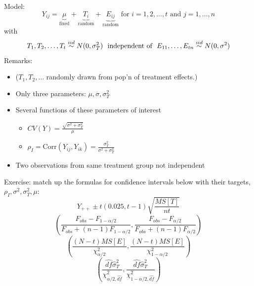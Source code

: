 Model:
$$ Y_{ij} = \underbrace{\mu}_{\text{fixed}} + \underbrace{T_i}_{\text{random}} 
+ \underbrace{E_{ij}}_{\text{random}} \text{ for }i=1,2,\ldots,t\mbox{ and }
j=1,\ldots,n$$
with
$$T_1,T_2,\ldots,T_t \stackrel{iid}{\sim} N(0,\sigma_T^2)\ \mbox{ independent of }\ E_{11},\ldots,E_{tn} \stackrel{iid}{\sim} N(0,\sigma^2)$$
\bigkn
Remarks:
\begin{itemize}
\item
($T_1,T_2,\ldots$ randomly drawn from pop'n of treatment
effects.)
\item Only three parameters: $\mu,\sigma,\sigma_T^2$
\item Several functions of these parameters of interest
\begin{itemize}
\item $CV(Y)=\frac{\sqrt{\sigma^2 + \sigma_T^2}}{\mu}$
\item $\rho_I=\mbox{Corr}(Y_{ij},Y_{ik})=\frac{\sigma_T^2}{\sigma^2 + \sigma_T^2}$
\end{itemize}
\item Two observations from same treatment group not independent
\end{itemize}
Exercise: match up the formulas for confidence intervals
below with their targets, $\rho_I,\sigma^2,\sigma_T^2,\mu$: 
$$Y_{++} \pm t(0.025,t-1) \sqrt{\frac{MS[T]}{nt}}$$
$$\left(\frac{F_{obs}-F_{1-\alpha/2}}{F_{obs}+(n-1)F_{1-\alpha/2}},\frac{F_{obs}-F_{\alpha/2}}{F_{obs}+(n-1)F_{\alpha/2}} \right)$$
$$\left(\frac{(N-t)MS[E]}{\chi^2_{\alpha/2}},\frac{(N-t)MS[E]}{\chi^2_{1-\alpha/2}}\right)$$
$$\left(\frac{\widehat{df}\hat\sigma_T^2}{\chi^2_{\alpha/2,\widehat{df}}} ,\frac{\widehat{df}\hat\sigma_T^2}{\chi^2_{1-\alpha/2,\widehat{df}}} \right)$$

